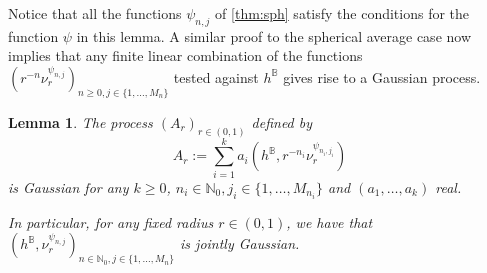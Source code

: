 \documentclass[10pt]{amsart}
\newtheorem{lemma}[theorem]{Lemma}
\theoremstyle{definition}
\newcommand{\N}{\mathbb{N}}
\newcommand{\B}{\mathbb{B}}\let\D\B\let\Ub\B
\begin{document}
Notice that all the functions $\psi_{n,j}$ of \cref{thm:sph} satisfy the conditions for the function $\psi$ in this lemma. A similar proof to the spherical average case now implies that any finite linear combination of the functions $(r^{-n}\nu^{\psi_{n,j}}_r)_{n \geq 0, j \in \{1, \dots, M_n\}}$ tested against $h^\B$ gives rise to a Gaussian process.

\begin{lemma}\label{lem:gp} The process $(A_r)_{r\in (0,1)}$ defined by\vspace*{-3pt}\enlargethispage{.2\baselineskip}%
\begin{equation}\label{eq:gp}
A_r := \sum_{i=1}^k a_i (h^\D,r^{-n_i}\nu^{\psi_{n_i,j_i}}_r)
\end{equation} is Gaussian for any $k\ge 0$, $n_i\in \N_0,j_i \in \{1, \dots, M_{n_i}\}$ and $(a_1,\dots, a_k)$ real.

In particular, for any fixed radius $r \in (0,1)$, we have that $(h^\B, \nu^{\psi_{n,j}}_r)_{n \in \N_0, j \in \{1, \dots, M_n\}}$ is jointly Gaussian.
\end{lemma}
\end{document}
